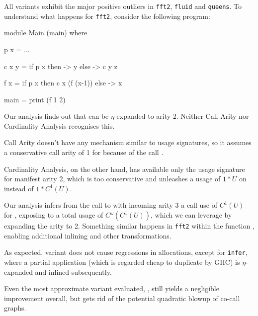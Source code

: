 All variants exhibit the major positive outliers in \texttt{fft2}, \texttt{fluid} and \texttt{queens}.
To understand what happens for \texttt{fft2}, consider the following program:
\begin{haskellcode}
  module Main (main) where

  p x = ...

  c x y = 
    if p x 
    then \z -> y 
    else \z -> c y z
  
  f x = 
    if p x 
    then c x (f (x-1))
    else \z -> x

  main = 
    print (f 1 2)
\end{haskellcode}

Our analysis finds out that  can be $\eta$-expanded to arity 2.
Neither Call Arity nor Cardinality Analysis recognises this.

Call Arity doesn't have any mechanism similar to usage signatures, so it assumes a conservative call arity of 1 for  because of the call .

Cardinality Analysis, on the other hand, has available only the usage signature for manifest arity 2, which is too conservative and unleashes a usage of $1*U$ on  instead of $1*C^1(U)$.

Our analysis infers from the call to  with incoming arity 3 a call use of $C^1(U)$ for , exposing  to a total usage of $C^\omega(C^1(U))$, which we can leverage by expanding the arity to 2.
Something similar happens in \texttt{fft2} within the function , enabling additional inlining and other transformations. \smallskip

As expected, variant \varfull does not cause regressions in allocations, except for \texttt{infer}, where a partial application (which is regarded cheap to duplicate by GHC) is $\eta$-expanded and inlined subsequently.

Even the most approximate variant evaluated, \varedges, still yields a negligible improvement overall, but gets rid of the potential quadratic blowup of co-call graphs.



